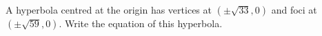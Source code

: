 A hyperbola centred at the origin has vertices at $\left(\pm\sqrt{33},0\right)$ and foci at $\left(\pm\sqrt{59},0\right)$. Write the equation of this hyperbola.
